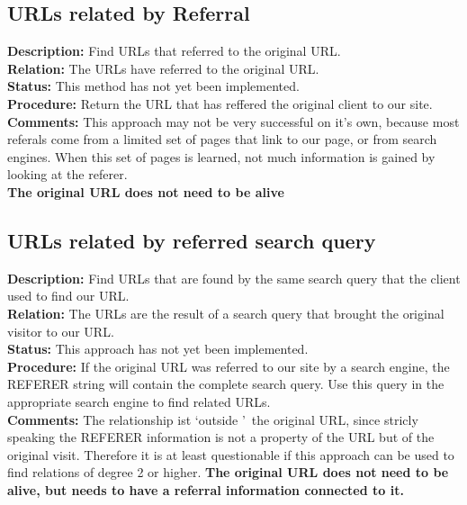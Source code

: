 \documentclass[a4paper]{danarticle}
\begin{document}
    \subsection*{URLs related by Referral}
      \textbf{Description:} Find URLs that referred to the original URL.
      \\
      \textbf{Relation:} The URLs have referred to the original URL.
      \\
      \textbf{Status:} This method has not yet been implemented.
      \\
      \textbf{Procedure:} Return the URL that has reffered the original
      client to our site. 
      \\
      \textbf{Comments:} This approach may not be very successful on it's own,
      because most referals come from a limited set of pages that link to our
      page, or from search engines. When this set of pages is learned, not much 
      information is gained by looking at the referer. 
      \\
      \textbf{The original URL does not need to be alive}
    \subsection*{URLs related by referred search query}
      \textbf{Description:} Find URLs that are found by the same search 
      query that the client used to find our URL.
      \\
      \textbf{Relation:} The URLs are the result of a search query that brought
      the original visitor to our URL. 
      \\
      \textbf{Status:} This approach has not yet been implemented.
      \\
      \textbf{Procedure:} If the original URL was referred to our site
      by a search engine, the REFERER string will contain the complete
      search query. Use this query in the appropriate search engine to find
      related URLs.
      \\
      \textbf{Comments:} The relationship ist \lq outside \rq\ the original
      URL, since stricly speaking the REFERER information is not a property
      of the URL but of the original visit. Therefore it is at least
      questionable if this approach can be used to find relations of degree 2 or
      higher.
      \textbf{The original URL does not need to be alive, but needs to have
      a referral information connected to it.}
\end{document}

